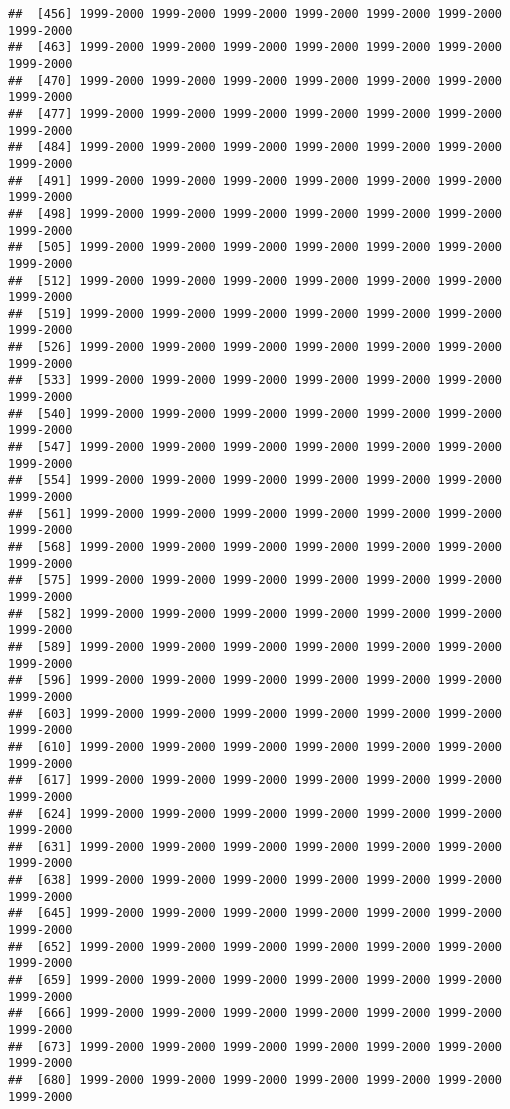 \documentclass[
]{article}
\begin{document}
\begin{verbatim}
##  [456] 1999-2000 1999-2000 1999-2000 1999-2000 1999-2000 1999-2000 1999-2000
##  [463] 1999-2000 1999-2000 1999-2000 1999-2000 1999-2000 1999-2000 1999-2000
##  [470] 1999-2000 1999-2000 1999-2000 1999-2000 1999-2000 1999-2000 1999-2000
##  [477] 1999-2000 1999-2000 1999-2000 1999-2000 1999-2000 1999-2000 1999-2000
##  [484] 1999-2000 1999-2000 1999-2000 1999-2000 1999-2000 1999-2000 1999-2000
##  [491] 1999-2000 1999-2000 1999-2000 1999-2000 1999-2000 1999-2000 1999-2000
##  [498] 1999-2000 1999-2000 1999-2000 1999-2000 1999-2000 1999-2000 1999-2000
##  [505] 1999-2000 1999-2000 1999-2000 1999-2000 1999-2000 1999-2000 1999-2000
##  [512] 1999-2000 1999-2000 1999-2000 1999-2000 1999-2000 1999-2000 1999-2000
##  [519] 1999-2000 1999-2000 1999-2000 1999-2000 1999-2000 1999-2000 1999-2000
##  [526] 1999-2000 1999-2000 1999-2000 1999-2000 1999-2000 1999-2000 1999-2000
##  [533] 1999-2000 1999-2000 1999-2000 1999-2000 1999-2000 1999-2000 1999-2000
##  [540] 1999-2000 1999-2000 1999-2000 1999-2000 1999-2000 1999-2000 1999-2000
##  [547] 1999-2000 1999-2000 1999-2000 1999-2000 1999-2000 1999-2000 1999-2000
##  [554] 1999-2000 1999-2000 1999-2000 1999-2000 1999-2000 1999-2000 1999-2000
##  [561] 1999-2000 1999-2000 1999-2000 1999-2000 1999-2000 1999-2000 1999-2000
##  [568] 1999-2000 1999-2000 1999-2000 1999-2000 1999-2000 1999-2000 1999-2000
##  [575] 1999-2000 1999-2000 1999-2000 1999-2000 1999-2000 1999-2000 1999-2000
##  [582] 1999-2000 1999-2000 1999-2000 1999-2000 1999-2000 1999-2000 1999-2000
##  [589] 1999-2000 1999-2000 1999-2000 1999-2000 1999-2000 1999-2000 1999-2000
##  [596] 1999-2000 1999-2000 1999-2000 1999-2000 1999-2000 1999-2000 1999-2000
##  [603] 1999-2000 1999-2000 1999-2000 1999-2000 1999-2000 1999-2000 1999-2000
##  [610] 1999-2000 1999-2000 1999-2000 1999-2000 1999-2000 1999-2000 1999-2000
##  [617] 1999-2000 1999-2000 1999-2000 1999-2000 1999-2000 1999-2000 1999-2000
##  [624] 1999-2000 1999-2000 1999-2000 1999-2000 1999-2000 1999-2000 1999-2000
##  [631] 1999-2000 1999-2000 1999-2000 1999-2000 1999-2000 1999-2000 1999-2000
##  [638] 1999-2000 1999-2000 1999-2000 1999-2000 1999-2000 1999-2000 1999-2000
##  [645] 1999-2000 1999-2000 1999-2000 1999-2000 1999-2000 1999-2000 1999-2000
##  [652] 1999-2000 1999-2000 1999-2000 1999-2000 1999-2000 1999-2000 1999-2000
##  [659] 1999-2000 1999-2000 1999-2000 1999-2000 1999-2000 1999-2000 1999-2000
##  [666] 1999-2000 1999-2000 1999-2000 1999-2000 1999-2000 1999-2000 1999-2000
##  [673] 1999-2000 1999-2000 1999-2000 1999-2000 1999-2000 1999-2000 1999-2000
##  [680] 1999-2000 1999-2000 1999-2000 1999-2000 1999-2000 1999-2000 1999-2000

\end{verbatim}
\end{document}

